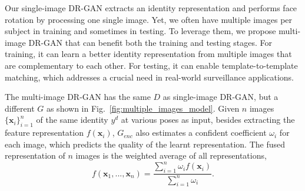 \documentclass[10pt,journal,compsoc]{IEEEtran}
\begin{document}
Our single-image DR-GAN extracts an identity representation and performs face rotation by processing one single image. 
Yet, we often have multiple images per subject in training and sometimes in testing.
To leverage them, we propose multi-image DR-GAN that can benefit both the training and testing stages. 
For training, it can learn a better identity representation from multiple images that are complementary to each other. 
For testing, it can enable template-to-template matching, which addresses a crucial need in real-world surveillance applications. 

The multi-image DR-GAN has the same $D$ as single-image DR-GAN, but a different $G$ as shown in Fig.~\ref{fig:multiple_images_model}. 
Given $n$ images $\{\mathbf{x}_i\}_{i=1}^n$ of the same identity $y^d$ at various poses as input, besides extracting the feature representation $f(\mathbf{x}_i)$, $G_{enc}$ also estimates a confident coefficient $\omega_i$ for each image, which predicts the quality of the learnt representation. 
The fused representation of $n$ images is the weighted average of all representations, 
\eqnvspace\begin{equation}
f(\mathbf{x}_1, ..., \mathbf{x}_n) = \frac{\sum_{i=1}^n \omega_i f(\mathbf{x}_i)}{\sum_{i=1}^n \omega_i}. 
\label{eqn:fuse}
\end{equation}
\end{document}
